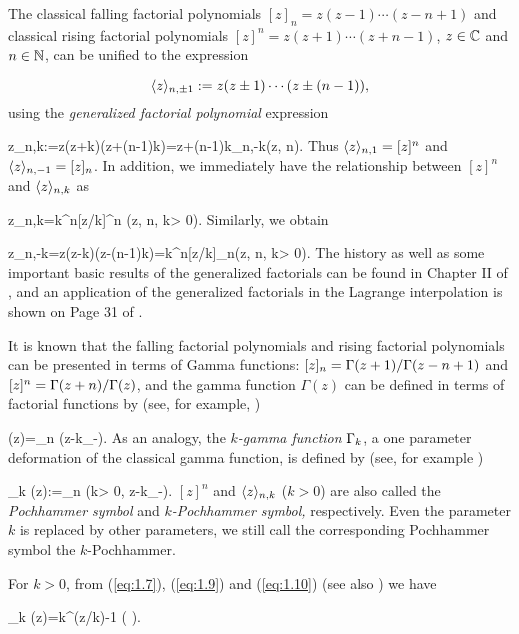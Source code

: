 The classical falling factorial polynomials $[z]_n=z(z-1)\cdots (z-n+1)$ and classical rising factorial polynomials $[z]^n=z(z+1)\cdots (z+n-1)$, $z\in{{\mathbb C}}$ and $n\in{{\mathbb N}}$, can be unified to the expression

\[
\langle z\rangle_{n,\pm 1}:=z(z\pm 1)\cdots (z\pm (n-1)),
\]
using the {\it generalized factorial polynomial} expression

\be\label{eq:1.6}
\la z\ra_{n,k}:=z(z+k)\cdots (z+(n-1)k)=\la z+(n-1)k\ra_{n,-k}\quad (z\in {\bC}, n\in {\bN}).
\ee
Thus $\langle z\rangle_{n,1}=[z]^n$ and $\langle z\rangle_{n,-1}=[z]_n$. In addition, we immediately have the relationship between $[z]^n$ and $\langle z \rangle_{n,k}$ as

\be\label{eq:1.7}
\la z\ra_{n,k}=k^n[z/k]^n \quad (z\in {\bC}, n\in {\bN}, k> 0).
\ee
Similarly, we obtain

\be\label{eq:1.8}
\la z\ra_{n,-k}=z(z-k)\cdots (z-(n-1)k)=k^n[z/k]_n\quad (z\in {\bC}, n\in {\bN}, k> 0).
\ee
The history as well as some important basic results of the generalized factorials can be found in Chapter II of \cite{Jor}, and an application of the generalized factorials in the Lagrange interpolation is shown on Page 31 of \cite{Gel}.


It is known that the falling factorial polynomials and rising factorial polynomials can be presented in terms of Gamma functions: $[z]_n={\Gamma}(z+1)/{\Gamma}(z-n+1)$ and $[z]^n={\Gamma} (z+n)/{\Gamma}(z)$, and the gamma function $\Gamma(z)$ can be defined in terms of factorial functions by (see, for example, \cite{MK})

\be\label{eq:1.9}
\Ga(z)=\displaystyle \lim_{n\to \infty}  \quad (z\in {\bC}-k{\bZ}_-).
\ee
As an analogy, the {\it $k$-gamma function} ${\Gamma}_k$, a one parameter deformation of the classical gamma function, is defined by (see, for example \cite{DP})

\be\label{eq:1.10}
\Ga_k (z):=\displaystyle\lim_{n\to \infty} \quad (k> 0, z\in {\bC}-k{\bZ}_-).
\ee
$[z]^n$ and $\langle z\rangle_{n,k}$ ($k>0$) are also called the {\it Pochhammer symbol} and {\it $k$-Pochhammer symbol,} respectively. Even the parameter $k$ is replaced by
other parameters, we still call the corresponding Pochhammer symbol the $k$-Pochhammer.

For $k>0$, from (\ref{eq:1.7}), (\ref{eq:1.9}) and (\ref{eq:1.10}) (see also \cite{Man}) we have

\be\label{eq:1.11}
\Ga_k (z)=k^{(z/k)-1} \Ga\left( \right).
\ee

